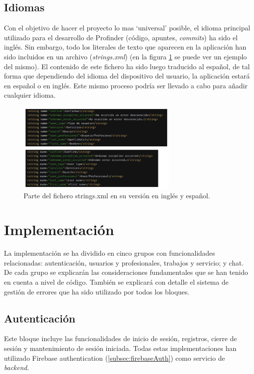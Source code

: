 \subsection{Idiomas}
Con el objetivo de hacer el proyecto lo mas ‘universal’ posible, el idioma principal utilizado para el desarrollo de Profinder (código, apuntes, \textit{commits}) ha sido el inglés. Sin embargo, todo los literales de texto que aparecen en la aplicación han sido incluidos en un archivo (\textit{strings.xml}) (en la figura \ref{fig:stringXml} se puede ver un ejemplo del mismo). El contenido de este fichero ha sido luego traducido al español, de tal forma que dependiendo del idioma del dispositivo del usuario, la aplicación estará en español o en inglés. Este mismo proceso podría ser llevado a cabo para añadir cualquier idioma.
\begin{figure}[h]
    \centering
    \includegraphics[width = 0.7\textwidth]{Imagenes/Fuentes/stringsXml.png}
    \caption{Parte del fichero strings.xml en su versión en inglés y español.}
    \label{fig:stringXml}
\end{figure}

\section{Implementación}
La implementación se ha dividido en cinco grupos con funcionalidades relacionadas: autenticación, usuarios y profesionales, trabajos y servicio; y chat. De cada grupo se explicarán las consideraciones fundamentales que se han tenido en cuenta a nivel de código. También se explicará con detalle el sistema de gestión de errores que ha sido utilizado por todos los bloques.
\subsection{Autenticación} 
Este bloque incluye las funcionalidades de inicio de sesión, registros, cierre de sesión y mantenimiento de sesión iniciada. Todas estas implementaciones han utilizado Firebase authentication (\ref{subsec:firebaseAuth}) como servicio de \textit{backend}.

